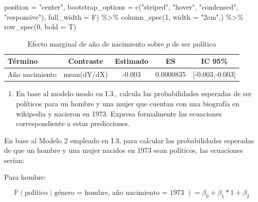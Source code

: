 \documentclass[
  12pt,
  a4paper,
]{article}
\newenvironment{Shaded}{\begin{snugshade}}{\end{snugshade}}
\newcommand{\AttributeTok}[1]{\textcolor[rgb]{0.77,0.63,0.00}{#1}}
\newcommand{\DecValTok}[1]{\textcolor[rgb]{0.00,0.00,0.81}{#1}}
\newcommand{\FunctionTok}[1]{\textcolor[rgb]{0.00,0.00,0.00}{#1}}
\newcommand{\NormalTok}[1]{#1}
\newcommand{\SpecialCharTok}[1]{\textcolor[rgb]{0.00,0.00,0.00}{#1}}
\newcommand{\StringTok}[1]{\textcolor[rgb]{0.31,0.60,0.02}{#1}}
\providecommand{\tightlist}{%
  \setlength{\itemsep}{0pt}\setlength{\parskip}{0pt}}
\begin{document}
\begin{Shaded}
\begin{Highlighting}[]
                            \AttributeTok{position =} \StringTok{"center"}\NormalTok{, }
                            \AttributeTok{bootstrap\_options =} \FunctionTok{c}\NormalTok{(}\StringTok{"striped"}\NormalTok{, }\StringTok{"hover"}\NormalTok{, }
                                                  \StringTok{"condensed"}\NormalTok{, }\StringTok{"responsive"}\NormalTok{), }
                            \AttributeTok{full\_width =}\NormalTok{ F) }\SpecialCharTok{\%\textgreater{}\%} 
  \FunctionTok{column\_spec}\NormalTok{(}\DecValTok{1}\NormalTok{, }\AttributeTok{width =} \StringTok{"2cm"}\NormalTok{,) }\SpecialCharTok{\%\textgreater{}\%}
  \FunctionTok{row\_spec}\NormalTok{(}\DecValTok{0}\NormalTok{, }\AttributeTok{bold =}\NormalTok{ T)}
\end{Highlighting}
\end{Shaded}

\begin{table}[!h]

\caption{\label{tab:table2}\label{tab:table2} Efecto marginal de año de nacimiento sobre $p$ 
                                    de ser político}
\centering
\begin{tabular}[t]{>{\centering\arraybackslash}p{2cm}cccc}
\toprule
\textbf{Término} & \textbf{Contraste} & \textbf{Estimado} & \textbf{ES} & \textbf{IC 95\%}\\
\midrule
Año nacimiento & mean(dY/dX) & -0.003 & 0.0000835 & {}[-0.003,-0.003]\\
\bottomrule
\end{tabular}
\end{table}

\begin{enumerate}
\def\labelenumi{\arabic{enumi}.}
\setcounter{enumi}{4}
\tightlist
\item
  En base al modelo usado en I.3., calcula las probabilidades esperadas de ser políticos para un hombre y una mujer que cuentan con una biografía en wikipedia y nacieron en 1973. Expresa formalmente las ecuaciones correspondiente a estas predicciones.
\end{enumerate}

En base al Modelo 2 empleado en I.3, para calcular las probabilidades esperadas de que un hombre y una mujer nacidos en 1973 sean políticos, las ecuaciones serían:

Para hombre:

\[
\mathbb{P}(\text{político | género = hombre, año nacimiento = 1973 }) = \beta_{0} + \beta_{1}*1 + \beta_{2} 
\]
\end{document}
